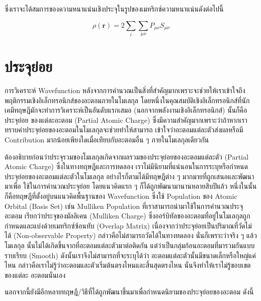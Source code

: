 \noindent ซึ่งเราจะได้สมการของความหนาแน่นเชิงประจุในรูปของเมทริกซ์ความหนาแน่นดังต่อไปนี้

\begin{equation}\label{eq:charge_density_matrix}
    \rho(\bm{r}) = 2 \sum_{i} \sum_{\mu\nu} P_{\mu\nu}S_{\mu\nu}
\end{equation}

\section{ประจุย่อย}
\label{sec:partial_charge}

การวิเคราะห์ Wavefunction หลังจากการคำนวณเป็นสิ่งที่สำคัญมากเพราะจะช่วยให้เราเข้าใจถึงพฤติกรรมเชิงอิเล็กทรอนิกส์ของอะตอมภายในโมเลกุล 
โดยหนึ่งในคุณสมบัติเชิงอิเล็กทรอนิกส์ที่นักเคมีทฤษฎีมักจะทำการวิเคราะห์เป็นอันดับแรกเสมอ (นอกจากพลังงานเชิงอิเล็กทรอนิกส์) นั้นก็คือประจุย่อย%
ของแต่ละอะตอม (Partial Atomic Charge) ซึ่งมีความสำคัญมากเพราะว่าถ้าหากเราทราบค่าประจุย่อยของอะตอมในโมเลกุลจะช่วยทำให้สามารถ%
เข้าใจว่าอะตอมแต่ละตัวส่งผลหรือมี Contribution มากน้อยเพียงใดเมื่อเทียบกับอะตอมอื่น ๆ ภายในโมเลกุลเดียวกัน

ต้องอธิบายก่อนว่าประจุรวมของโมเลกุลเกิดจากผลรวมของประจุย่อยของอะตอมแต่ละตัว (Partial Atomic Charge) ซึ่งในทางทฤษฎีและการทดลอง%
เราไม่มีนิยามที่แน่นอนในการระบุหรือกำหนดประจุย่อยของอะตอมแต่ละตัวในโมเลกุล อย่างไรก็ตามได้มีทฤษฎีต่าง ๆ มากมายที่ถูกเสนอและพัฒนามาเพื่อ%
ใช้ในการคำนวณประจุย่อย โดยแนวคิดแรก ๆ ก็ได้ถูกพัฒนามานานหลายสิบปีแล้ว หนึ่งในนั้นก็คือทฤษฎีที่ตั้งอยู่บนแนวคิดพื้นฐานของ Wavefunction 
ซึ่งใช้ Population ของ Atomic Orbital (Basis Set) เช่น Mulliken Population ที่เราสามารถนำมาใช้ในการคำนวณประจุอะตอม 
เรียกว่าประจุของมัลลิเคน (Mulliken Charge) ซึ่งออร์บิทัลของอะตอมที่อยู่ในโมเลกุลถูกกำหนดและแบ่งด้วยเมทริกซ์ซ้อนทับ (Overlap Matrix) 
เนื่องจากว่าประจุย่อยเป็นปริมาณที่วัดไม่ได้ (Non-observable Property) กล่าวคือไม่สามารถวัดได้ในทางทดลอง นั่นก็เพราะว่าจริง ๆ แล้วโมเลกุล%
นั้นไม่ได้เกิดขึ้นจากที่อะตอมแต่ละตัวมาต่อติดกัน แต่ว่าเป็นกลุ่มก้อนอะตอมที่มารวมกันแบบราบเรียบ (Smooth) ดังนั้นเราจึงไม่สามารถที่จะระบุได้ว่า%
อะตอมแต่ละตัวนั้นมีขนาดเล็กหรือใหญ่แค่ไหน กล่าวคือเราไม่รู้ว่าอะตอมและตัวเริ่มต้นตรงไหนและสิ้นสุดตรงไหน นั่นจึงทำให้เราไม่รู้ขอบเขตของแต่ละ%
อะตอมนั่นเอง

นอกจากนี้ยังมีอีกหลายทฤษฎี/วิธีที่ได้ถูกพัฒนาขึ้นมาเพื่อกำหนดนิยามของประจุย่อยของอะตอม ดังนี้

